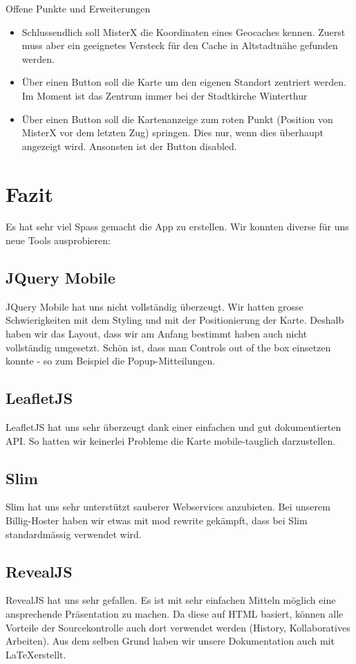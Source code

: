 \documentclass[11pt]{article}
\begin{document}
Offene Punkte und Erweiterungen
\begin{itemize}
\item Schlussendlich soll MisterX die Koordinaten eines Geocaches kennen. Zuerst muss aber ein geeignetes Versteck für den Cache in Altstadtnähe gefunden werden.

\item Über einen Button soll die Karte um den eigenen Standort zentriert werden. Im Moment ist das Zentrum immer bei der Stadtkirche Winterthur
\item Über einen Button soll die Kartenanzeige zum roten Punkt (Position von MisterX vor dem letzten Zug) springen. Dies nur, wenn dies überhaupt angezeigt wird. Ansonsten ist der Button disabled. 
\end{itemize}




\section{Fazit}
Es hat sehr viel Spass gemacht die App zu erstellen. Wir konnten diverse für uns neue Tools ausprobieren: 

\subsection{JQuery Mobile}
JQuery Mobile hat uns nicht vollständig überzeugt. Wir hatten grosse Schwierigkeiten mit dem Styling und mit der Positionierung der Karte. Deshalb haben wir das Layout, dass wir am Anfang bestimmt haben auch nicht vollständig umgesetzt. Schön ist, dass man Controls out of the box einsetzen konnte - so zum Beispiel die Popup-Mitteilungen. 

\subsection{LeafletJS}
LeafletJS hat uns sehr überzeugt dank einer einfachen und gut dokumentierten API. So hatten wir keinerlei Probleme die Karte mobile-tauglich darzustellen. 

\subsection{Slim}
Slim hat uns sehr unterstützt sauberer Webservices anzubieten. Bei unserem Billig-Hoster haben wir etwas mit mod rewrite gekämpft, dass bei Slim standardmässig verwendet wird. 

\subsection{RevealJS}
RevealJS hat uns sehr gefallen. Es ist mit sehr einfachen Mitteln möglich eine ansprechende Präsentation zu machen. Da diese auf HTML basiert, können alle Vorteile der Sourcekontrolle auch dort verwendet werden (History, Kollaboratives Arbeiten). Aus dem selben Grund haben wir unsere Dokumentation auch mit \LaTeX erstellt. 
\end{document}
